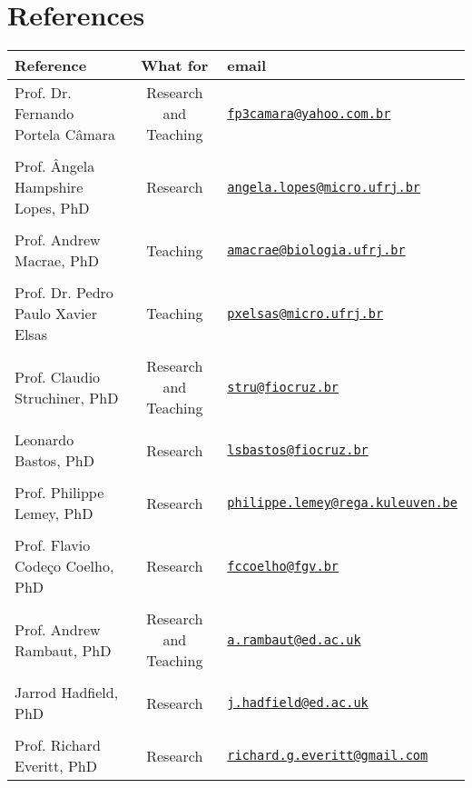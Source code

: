 \documentclass[10pt]{article}
\newcommand\VRule{\color{lightgray}\vrule width 0.5pt}
\begin{document}
\section*{References}
\begin{tabular}{lcl}%
\toprule
Reference & What for & email \\
\midrule
Prof. Dr. Fernando Portela C\^amara& Research and Teaching & \href{mailto:fp3camara@yahoo.com.br}{\nolinkurl{fp3camara@yahoo.com.br}}\\
\\
Prof. \^Angela Hampshire Lopes, PhD & Research & \href{mailto:angela.lopes@micro.ufrj.br}{\nolinkurl{angela.lopes@micro.ufrj.br}}\\
\\
Prof. Andrew Macrae, PhD&Teaching & \href{mailto:amacrae@biologia.ufrj.br}{\nolinkurl{amacrae@biologia.ufrj.br}}\\
\\
Prof. Dr. Pedro Paulo Xavier Elsas & Teaching & \href{mailto:pxelsas@micro.ufrj.br}{\nolinkurl{pxelsas@micro.ufrj.br}}\\
\\
Prof. Claudio Struchiner, PhD & Research and Teaching &  \href{mailto:stru@fiocruz.br}{\nolinkurl{stru@fiocruz.br}} \\
\\
Leonardo Bastos, PhD &Research&  \href{mailto:lsbastos@fiocruz.br}{\nolinkurl{lsbastos@fiocruz.br}} \\
\\
Prof. Philippe Lemey, PhD & Research & \href{mailto:philippe.lemey@rega.kuleuven.be}{\nolinkurl{philippe.lemey@rega.kuleuven.be}}\\
\\
Prof. Flavio Code\c{c}o Coelho, PhD & Research & \href{mailto:fccoelho@fgv.br}{\nolinkurl{fccoelho@fgv.br}}\\
\\
Prof. Andrew Rambaut, PhD & Research and Teaching & \href{mailto:a.rambaut@ed.ac.uk }{\nolinkurl{a.rambaut@ed.ac.uk}}\\
\\
Jarrod Hadfield, PhD & Research & \href{mailto:j.hadfield@ed.ac.uk }{\nolinkurl{j.hadfield@ed.ac.uk}}\\
\\
Prof. Richard Everitt, PhD & Research & \href{mailto:richard.g.everitt@gmail.com}{\nolinkurl{richard.g.everitt@gmail.com}}\\
\bottomrule
\end{tabular}
\end{document}
